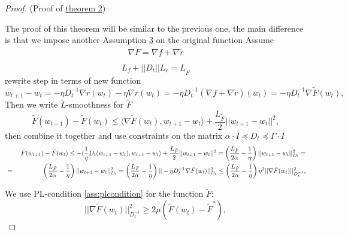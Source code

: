 \documentclass[USenglish]{article}
\theoremstyle{dgthm}
\theoremstyle{dgdef}
\begin{document}
\begin{proof} (Proof of \hyperref[theor:2]{theorem 2})
\label{proof:theorem2}

    
    The proof of this theorem will be similar to the previous one, the main difference is that we impose another Assumption \hyperref[ass:plcondition]{3} on the original function 
    Assume 
    \begin{equation*}
    \nabla \tilde{F} = \nabla f + \nabla \tilde{r}    
    \end{equation*}
    
    \begin{equation*}
    L_{f} + ||D_t||L_{r} = L_{\tilde{F}}        
    \end{equation*}
    rewrite step in terms of new function
    \begin{equation*}
    w_{t+1} - w_t = -\eta D_t^{-1} \nabla r(w_t) - \eta \nabla r(w_t) = -\eta D_t^{-1} (\nabla f + \nabla \tilde{r})(w_t) = -\eta D_t^{-1} \nabla \tilde{F}(w_t),
    \end{equation*}
    Then we write $\tilde{L}$-smoothness for $\tilde{F}$ 
    \begin{equation*}
        \tilde{F}(w_{t+1}) - \tilde{F}(w_t) \leq  \langle \nabla \tilde{F}(w_t), w_{t+1} - w_t \rangle + \frac{L_{\tilde{F}}}{2} ||w_{t+1} - w_t||^2,
    \end{equation*}
    then combine it together and use constraints on the matrix $\alpha \cdot I \preccurlyeq D_t \preccurlyeq \Gamma \cdot I$
    \begin{eqnarray*}
&& \        \tilde{F}(w_{t+1}) - \tilde{F}(w_t) \leq - \langle \frac{1}{\eta} D_t(w_{t+1} - w_t), w_{t+1} - w_t \rangle + \frac{L_{\tilde{F}}}{2} ||w_{t+1} - w_t||^2 = \left( \frac{L_{\tilde{F}}}{2 \alpha} - \frac{1}{\eta} \right) ||w_{t+1} - w_t||^2_{D_t} =
\notag\\& =&
\left(\frac{L_{\tilde{F}}}{2 \alpha} - \frac{1}{\eta} \right) ||w_{t+1} - w_t||^2_{D_t} = \left(\frac{L_{\tilde{F}}}{2 \alpha} - \frac{1}{\eta} \right) ||-\eta D_t^{-1} \nabla \tilde{F}(w_t)||_{D_t}^2  \leq \left(\frac{L_{\tilde{F}}}{2 \alpha} - \frac{1}{\eta} \right) \eta^2 ||\nabla \tilde{F}(w_t)||^2_{D_t^{-1}},
\end{eqnarray*}

    We use PL-condition \ref{ass:plcondition} for the function $\tilde{F}$:
    \begin{equation*}
        ||\nabla \tilde{F}(w_t)||_{D_t^{-1}}^2 \geq 2 \mu (\tilde{F}(w_t) - \tilde{F}^*),
    \end{equation*}
    

\end{proof}
\end{document}
